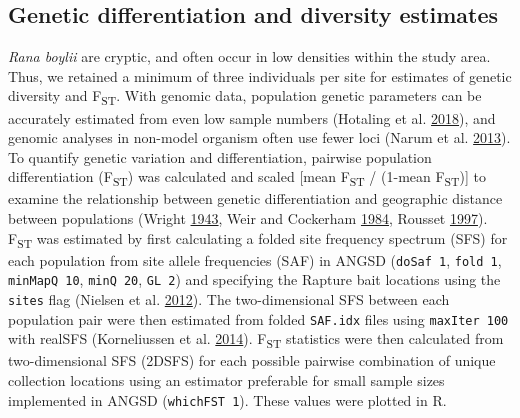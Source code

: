\documentclass[proquest,12pt,final]{ucthesis-CA2012} %
\begin{document}
\begin{ucmainmatter}
{\subsection{Genetic differentiation and diversity
estimates}\label{genetic-differentiation-and-diversity-estimates-1}}

\emph{Rana boylii} are cryptic, and often occur in low densities within
the study area. Thus, we retained a minimum of three individuals per
site for estimates of genetic diversity and F\textsubscript{ST}. With
genomic data, population genetic parameters can be accurately estimated
from even low sample numbers (Hotaling et al.
\protect\hyperlink{ref-hotaling_demographic_2018}{2018}), and genomic
analyses in non-model organism often use fewer loci (Narum et al.
\protect\hyperlink{ref-narum_genotyping-by-sequencing_2013}{2013}). To
quantify genetic variation and differentiation, pairwise population
differentiation (F\textsubscript{ST}) was calculated and scaled {[}mean
F\textsubscript{ST} / (1-mean F\textsubscript{ST}){]} to examine the
relationship between genetic differentiation and geographic distance
between populations (Wright
\protect\hyperlink{ref-wright_isolation_1943}{1943}, Weir and Cockerham
\protect\hyperlink{ref-weir_estimating_1984}{1984}, Rousset
\protect\hyperlink{ref-rousset_genetic_1997}{1997}). F\textsubscript{ST}
was estimated by first calculating a folded site frequency spectrum
(SFS) for each population from site allele frequencies (SAF) in ANGSD
(\texttt{doSaf\ 1}, \texttt{fold\ 1}, \texttt{minMapQ\ 10},
\texttt{minQ\ 20}, \texttt{GL\ 2}) and specifying the Rapture bait
locations using the \texttt{sites} flag (Nielsen et al.
\protect\hyperlink{ref-nielsen_snp_2012}{2012}). The two-dimensional SFS
between each population pair were then estimated from folded
\texttt{SAF.idx} files using \texttt{maxIter\ 100} with realSFS
(Korneliussen et al.
\protect\hyperlink{ref-korneliussen_angsd_2014}{2014}).
F\textsubscript{ST} statistics were then calculated from two-dimensional
SFS (2DSFS) for each possible pairwise combination of unique collection
locations using an estimator preferable for small sample sizes
implemented in ANGSD (\texttt{whichFST\ 1}). These values were plotted
in R.


\end{ucmainmatter}
\end{document}
